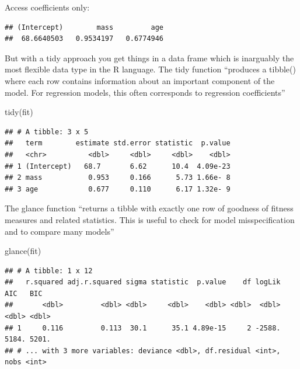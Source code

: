 \documentclass[
]{article}
\newenvironment{Shaded}{\begin{snugshade}}{\end{snugshade}}
\newcommand{\FunctionTok}[1]{\textcolor[rgb]{0.00,0.00,0.00}{#1}}
\newcommand{\NormalTok}[1]{#1}
\newcommand{\SpecialCharTok}[1]{\textcolor[rgb]{0.00,0.00,0.00}{#1}}
\begin{document}
Access coefficients only:

\begin{Shaded}
\end{Shaded}

\begin{verbatim}
## (Intercept)        mass         age 
##  68.6640503   0.9534197   0.6774946
\end{verbatim}

But with a tidy approach you get things in a data frame which is
inarguably the most flexible data type in the R language. The tidy
function ``produces a tibble() where each row contains information about
an important component of the model. For regression models, this often
corresponds to regression coefficients''

\begin{Shaded}
\begin{Highlighting}[]
\FunctionTok{tidy}\NormalTok{(fit)}
\end{Highlighting}
\end{Shaded}

\begin{verbatim}
## # A tibble: 3 x 5
##   term        estimate std.error statistic  p.value
##   <chr>          <dbl>     <dbl>     <dbl>    <dbl>
## 1 (Intercept)   68.7       6.62      10.4  4.09e-23
## 2 mass           0.953     0.166      5.73 1.66e- 8
## 3 age            0.677     0.110      6.17 1.32e- 9
\end{verbatim}

The glance function ``returns a tibble with exactly one row of goodness
of fitness measures and related statistics. This is useful to check for
model misspecification and to compare many models''

\begin{Shaded}
\begin{Highlighting}[]
\FunctionTok{glance}\NormalTok{(fit)}
\end{Highlighting}
\end{Shaded}

\begin{verbatim}
## # A tibble: 1 x 12
##   r.squared adj.r.squared sigma statistic  p.value    df logLik   AIC   BIC
##       <dbl>         <dbl> <dbl>     <dbl>    <dbl> <dbl>  <dbl> <dbl> <dbl>
## 1     0.116         0.113  30.1      35.1 4.89e-15     2 -2588. 5184. 5201.
## # ... with 3 more variables: deviance <dbl>, df.residual <int>, nobs <int>
\end{verbatim}
\end{document}
